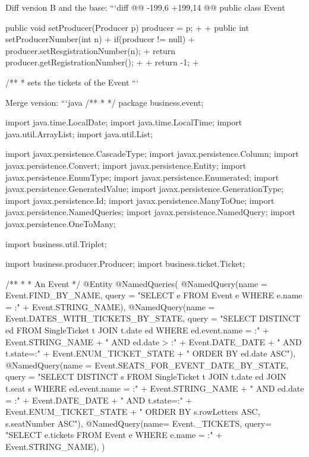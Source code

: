 \begin{prompt}
{{  Diff version B and the base:
  ```diff
  @@ -199,6 +199,14 @@ public class Event {
          public void setProducer(Producer p){
                  producer = p;
          }
  +
  +       public int setProducerNumber(int n){
  +               if(producer != null){
  +                       producer.setResgistrationNumber(n);
  +                       return producer.getRegistrationNumber();
  +               }
  +               return -1;
  +       }
  
          /**
           * sets the tickets of the Event
  ```
  
  Merge version:
  ```java
  /**
   * 
   */
  package business.event;
  
  
  
  import java.time.LocalDate;
  import java.time.LocalTime;
  import java.util.ArrayList;
  import java.util.List;
  
  import javax.persistence.CascadeType;
  import javax.persistence.Column;
  import javax.persistence.Convert;
  import javax.persistence.Entity;
  import javax.persistence.EnumType;
  import javax.persistence.Enumerated;
  import javax.persistence.GeneratedValue;
  import javax.persistence.GenerationType;
  import javax.persistence.Id;
  import javax.persistence.ManyToOne;
  import javax.persistence.NamedQueries;
  import javax.persistence.NamedQuery;
  import javax.persistence.OneToMany;
  
  import business.util.Triplet;
  
  import business.producer.Producer;
  import business.ticket.Ticket;
  
  /**
   * 
   * An Event
   */
  @Entity
  @NamedQueries({
      @NamedQuery(name = Event.FIND_BY_NAME, query = "SELECT e FROM Event e WHERE e.name = :" + Event.STRING_NAME),
      @NamedQuery(name = Event.DATES_WITH_TICKETS_BY_STATE, query = "SELECT DISTINCT ed FROM SingleTicket t JOIN t.date ed WHERE ed.event.name = :"
          + Event.STRING_NAME + " AND ed.date > :" + Event.DATE_DATE
          + " AND t.state=:" + Event.ENUM_TICKET_STATE + " ORDER BY ed.date ASC"),
      @NamedQuery(name = Event.SEATS_FOR_EVENT_DATE_BY_STATE, query = "SELECT DISTINCT s FROM SingleTicket t JOIN t.date ed JOIN t.seat s WHERE ed.event.name = :"
          + Event.STRING_NAME + " AND ed.date = :" + Event.DATE_DATE
          + " AND t.state=:" + Event.ENUM_TICKET_STATE + " ORDER BY s.rowLetters ASC, s.seatNumber ASC"),
      @NamedQuery(name= Event._TICKETS, query= "SELECT e.tickets FROM Event e WHERE e.name = :" + Event.STRING_NAME),
      })
  
}}}
\end{prompt}
